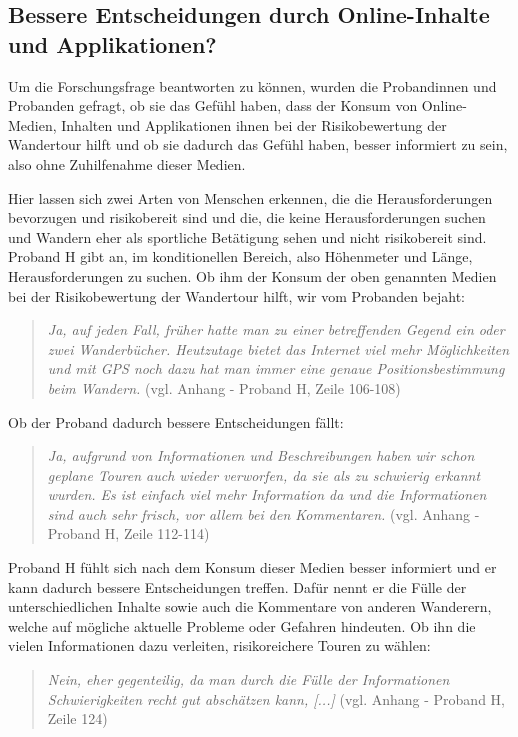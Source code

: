 \subsection{Bessere Entscheidungen durch Online-Inhalte und Applikationen?}

Um die Forschungsfrage beantworten zu können, wurden die Probandinnen und Probanden gefragt, ob sie das Gefühl haben, dass der Konsum von Online-Medien, Inhalten und Applikationen ihnen bei der Risikobewertung der Wandertour hilft und ob sie dadurch das Gefühl haben, besser informiert zu sein, also ohne Zuhilfenahme dieser Medien.

Hier lassen sich zwei Arten von Menschen erkennen, die die Herausforderungen bevorzugen und risikobereit sind und die, die keine Herausforderungen suchen und Wandern eher als sportliche Betätigung sehen und nicht risikobereit sind. Proband H gibt an, im konditionellen Bereich, also Höhenmeter und Länge, Herausforderungen zu suchen. Ob ihm der Konsum der oben genannten Medien bei der Risikobewertung der Wandertour hilft, wir vom Probanden bejaht:

\begin{quote}
	\textit{\glqq Ja, auf jeden Fall, früher hatte man zu einer betreffenden Gegend ein oder zwei Wanderbücher. Heutzutage bietet das Internet viel mehr Möglichkeiten und mit GPS noch dazu hat man immer eine genaue Positionsbestimmung beim Wandern.\grqq} (vgl. Anhang - Proband H, Zeile 106-108)
\end{quote}

Ob der Proband dadurch bessere Entscheidungen fällt:

\begin{quote}
	\textit{\glqq Ja, aufgrund von Informationen und Beschreibungen haben wir schon geplane Touren auch wieder verworfen, da sie als zu schwierig erkannt wurden. Es ist einfach viel mehr Information da und die Informationen sind auch sehr frisch, vor allem bei den Kommentaren.\grqq} (vgl. Anhang - Proband H, Zeile 112-114)
\end{quote}

Proband H fühlt sich nach dem Konsum dieser Medien besser informiert und er kann dadurch bessere Entscheidungen treffen. Dafür nennt er die Fülle der unterschiedlichen Inhalte sowie auch die Kommentare von anderen Wanderern, welche auf mögliche aktuelle Probleme oder Gefahren hindeuten. Ob ihn die vielen Informationen dazu verleiten, risikoreichere Touren zu wählen:

\begin{quote}
	\textit{\glqq Nein, eher gegenteilig, da man durch die Fülle der Informationen Schwierigkeiten recht gut abschätzen kann, [...]\grqq} (vgl. Anhang - Proband H, Zeile 124)
\end{quote}

